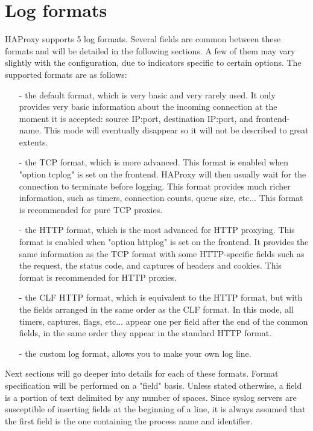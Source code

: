 \section{Log formats}
\label{sec:log_formats}

HAProxy supports 5 log formats. Several fields are common between these formats
and will be detailed in the following sections. A few of them may vary
slightly with the configuration, due to indicators specific to certain
options. The supported formats are as follows:

\begin{itemize}
\item[-] the default format, which is very basic and very rarely used. It only
    provides very basic information about the incoming connection at the moment
    it is accepted: source IP:port, destination IP:port, and frontend-name.
    This mode will eventually disappear so it will not be described to great
    extents.

\item[-] the TCP format, which is more advanced. This format is enabled when "option
    tcplog" is set on the frontend. HAProxy will then usually wait for the
    connection to terminate before logging. This format provides much richer
    information, such as timers, connection counts, queue size, etc... This
    format is recommended for pure TCP proxies.

\item[-] the HTTP format, which is the most advanced for HTTP proxying. This format
    is enabled when "option httplog" is set on the frontend. It provides the
    same information as the TCP format with some HTTP-specific fields such as
    the request, the status code, and captures of headers and cookies. This
    format is recommended for HTTP proxies.

\item[-] the CLF HTTP format, which is equivalent to the HTTP format, but with the
    fields arranged in the same order as the CLF format. In this mode, all
    timers, captures, flags, etc... appear one per field after the end of the
    common fields, in the same order they appear in the standard HTTP format.

\item[-] the custom log format, allows you to make your own log line.
\end{itemize}

Next sections will go deeper into details for each of these formats. Format
specification will be performed on a "field" basis. Unless stated otherwise, a
field is a portion of text delimited by any number of spaces. Since syslog
servers are susceptible of inserting fields at the beginning of a line, it is
always assumed that the first field is the one containing the process name and
identifier.


